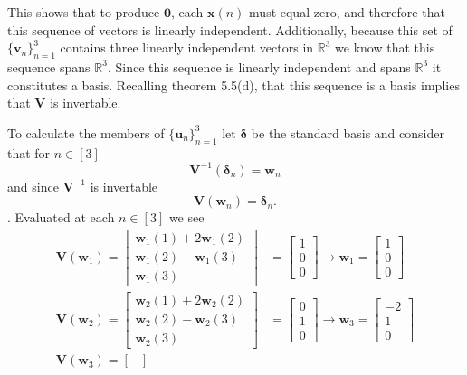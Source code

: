 \documentclass[12pt]{amsart}
\newcommand{\1}{\mathbbm{1}}
\numberwithin{equation}{section}
\numberwithin{Theorem}{section}
\theoremstyle{plain} %
\theoremstyle{definition}
\theoremstyle{remark}
\begin{document}
\begin{enumerate}[1.]
This shows that to produce $\mathbf{0}$, each $\mathbf{x}(n)$ must equal zero, and therefore that this sequence of vectors is linearly independent. 
Additionally, because this set of \(\{\mathbf{v}_{n}\}_{n=1}^{3}\) contains three linearly independent vectors in $\mathbb{R}^3$ we know that this sequence spans $\mathbb{R}^3$. 
Since this sequence is linearly independent and spans $\mathbb{R}^3$ it constitutes a basis. 
Recalling theorem 5.5(d), that this sequence is a basis implies that \(\mathbf{V}\) is invertable.

To calculate the members of \(\{\mathbf{u}_{n}\}_{n=1}^{3}\) let
$\boldsymbol{\delta}$ be the standard basis and
consider that for $n\in[3]$ 
\[
\mathbf{V}^{-1}(\boldsymbol{\delta}_n) = \mathbf{w}_n  
\]
and since $\mathbf{V}^{-1}$ is invertable
\[
\mathbf{V}(\mathbf{w}_n) = \boldsymbol{\delta}_n .
\].
Evaluated at each $n\in[3]$ we see
\begin{align*}
	\mathbf{V}(\mathbf{w}_1) =
	\begin{bmatrix}
		\mathbf{w}_1(1) + 2\mathbf{w}_1(2) \\
		\mathbf{w}_1(2) -  \mathbf{w}_1(3) \\
		\mathbf{w}_1(3)
	\end{bmatrix}
	&= 
	\begin{bmatrix} 1 \\ 0 \\ 0 \end{bmatrix}
	\rightarrow
	\mathbf{w}_1 =
	\begin{bmatrix} 1 \\ 0 \\ 0 \end{bmatrix}
	\\
	\mathbf{V}(\mathbf{w}_2) =
	\begin{bmatrix}
		\mathbf{w}_2(1) + 2\mathbf{w}_2(2) \\
		\mathbf{w}_2(2) -  \mathbf{w}_2(3) \\
		\mathbf{w}_2(3)
	\end{bmatrix}
	&= 
	\begin{bmatrix} 0 \\ 1 \\ 0 \end{bmatrix}
	\rightarrow
	\mathbf{w}_3 =
	\begin{bmatrix} -2 \\ 1 \\ 0 \end{bmatrix}
	\\
	\mathbf{V}(\mathbf{w}_3) =
	\begin{bmatrix}

\end{bmatrix}
\end{align*}
\end{enumerate}
\end{document}
